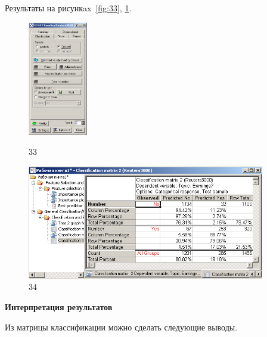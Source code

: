 Результаты на рисункax~\ref{fig:33}, \ref{fig:34}.

\begin{figure}[!h]
  \centering

  \begin{minipage}{0.29\textwidth}
    \centering

    \includegraphics[height=5cm]
    {inc/33.PNG}

    \caption{33}

    \label{fig:33}
  \end{minipage}
  \begin{minipage}{0.69\textwidth}
    \centering

    \includegraphics[height=5cm]
    {inc/34.PNG}

    \caption{34}

    \label{fig:34}
  \end{minipage}
\end{figure}

\newpage

\begin{center}
  \textbf{Интерпретация результатов}
\end{center}

Из матрицы классификации можно сделать следующие выводы.

